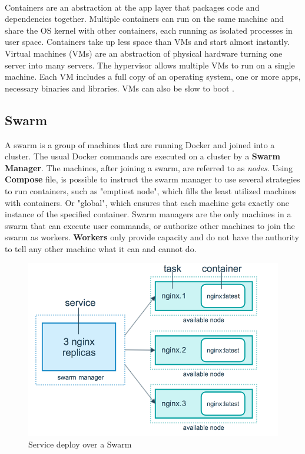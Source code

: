 \\[1\baselineskip]
Containers are an abstraction at the app layer that packages code and dependencies together. Multiple containers can run on the same machine and share the OS kernel with other containers, each running as isolated processes in user space. Containers take up less space than VMs and start almost instantly.\newline
Virtual machines (VMs) are an abstraction of physical hardware turning one server into many servers. The hypervisor allows multiple VMs to run on a single machine. Each VM includes a full copy of an operating system, one or more apps, necessary binaries and libraries. VMs can also be slow to boot \cite{Docker}.
\subsection{Swarm}
A swarm is a group of machines that are running Docker and joined into a cluster. The usual Docker commands are executed on a cluster by a \textbf{Swarm Manager}. The machines, after joining a swarm, are referred to as \textit{nodes}.\newline
Using \textbf{Compose} file, is possible to instruct the swarm manager to use several strategies to run containers, such as "emptiest node", which fills the least utilized machines with containers. Or "global", which ensures that each machine gets exactly one instance of the specified container.\newline
Swarm managers are the only machines in a swarm that can execute user commands, or authorize other machines to join the swarm as workers. \textbf{Workers} only provide capacity and do not have the authority to tell any other machine what it can and cannot do.
\begin{figure}[h] 
\begin{center}
\includegraphics[scale=0.5]{figure/services-swarm.png}
\end{center}
\caption{Service deploy over a Swarm ~\label{services_swarm}}
\end{figure}
